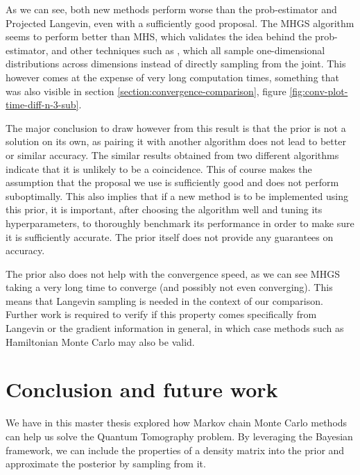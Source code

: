 \documentclass[12pt]{memoir}
\begin{document}
As we can see, both new methods perform worse than the prob-estimator and Projected Langevin, even with a sufficiently good proposal. The MHGS algorithm seems to perform better than MHS, which validates the idea behind the prob-estimator, and other techniques such as \cite{Mai22, LLJL20}, which all sample one-dimensional distributions across dimensions instead of directly sampling from the joint. This however comes at the expense of very long computation times, something that was also visible in section \ref{section:convergence-comparison}, figure \ref{fig:conv-plot-time-diff-n-3-sub}.\medbreak

The major conclusion to draw however from this result is that the prior is not a solution on its own, as pairing it with another algorithm does not lead to better or similar accuracy. The similar results obtained from two different algorithms indicate that it is unlikely to be a coincidence. This of course makes the assumption that the proposal we use is sufficiently good and does not perform suboptimally. This also implies that if a new method is to be implemented using this prior, it is important, after choosing the algorithm well and tuning its hyperparameters, to thoroughly benchmark its performance in order to make sure it is sufficiently accurate. The prior itself does not provide any guarantees on accuracy.\medbreak

The prior also does not help with the convergence speed, as we can see MHGS taking a very long time to converge (and possibly not even converging). This means that Langevin sampling is needed in the context of our comparison. Further work is required to verify if this property comes specifically from Langevin or the gradient information in general, in which case methods such as Hamiltonian Monte Carlo may also be valid.

\chapter{Conclusion and future work}
We have in this master thesis explored how Markov chain Monte Carlo methods can help us solve the Quantum Tomography problem. By leveraging the Bayesian framework, we can include the properties of a density matrix into the prior and approximate the posterior by sampling from it.\medbreak
\end{document}
